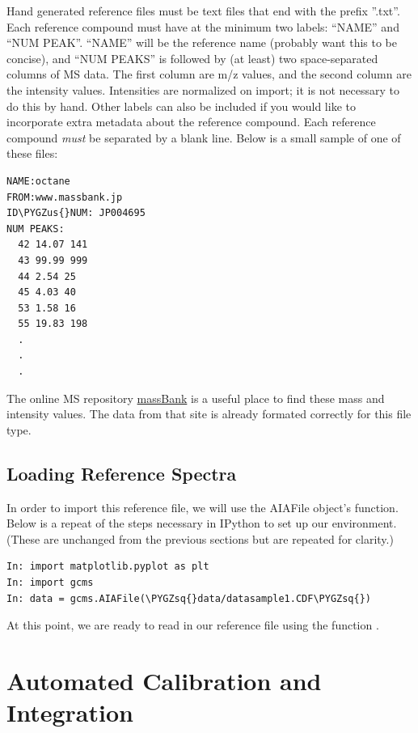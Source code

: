 \documentclass[letterpaper,10pt,english]{sphinxmanual}
\def\PYGZus{\char`\_}
\def\PYGZsq{\char`\'}
\begin{document}
Hand generated reference files must be text files that end with the prefix
''.txt''. Each reference compound must have at the minimum two labels: ``NAME''
and ``NUM PEAK''. ``NAME'' will be the reference name (probably want this to be
concise), and ``NUM PEAKS'' is followed by (at least) two space-separated
columns of MS data. The first column are m/z values, and the second column
are the intensity values. Intensities are normalized on import;
it is not necessary to do this by hand. Other labels can also be included if
you would like to incorporate extra metadata about the reference compound.
Each reference compound \emph{must} be separated by a blank line. Below is a small
sample of one of these files:

\begin{Verbatim}[commandchars=\\\{\}]
NAME:octane
FROM:www.massbank.jp
ID\PYGZus{}NUM: JP004695
NUM PEAKS:
  42 14.07 141
  43 99.99 999
  44 2.54 25
  45 4.03 40
  53 1.58 16
  55 19.83 198
  .
  .
  .
\end{Verbatim}

The online MS repository \href{http://www.massbank.jp/?lang=en}{massBank} is a useful place to find these mass and
intensity values. The data from that site is already formated correctly for
this file type.


\section{Loading Reference Spectra}
\label{fitting:loading-reference-spectra}\label{fitting:massbank}
In order to import this reference file, we will use the AIAFile object's
 function. Below is a repeat of the steps necessary in IPython to
set up our environment. (These are unchanged from the previous sections but are
repeated for clarity.)

\begin{Verbatim}[commandchars=\\\{\}]
In: import matplotlib.pyplot as plt
In: import gcms
In: data = gcms.AIAFile(\PYGZsq{}data/datasample1.CDF\PYGZsq{})
\end{Verbatim}

At this point, we are ready to read in our reference file using the function
.


\chapter{Automated Calibration and Integration}
\label{calibration:automated-calibration-and-integration}\label{calibration::doc}
\end{document}
